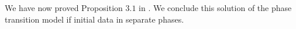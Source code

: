 \documentclass[10pt]{article}
\numberwithin{equation}{section}
\begin{document}
We have now proved Proposition $3.1$ in \cite{Colombo2003}. We conclude this solution of the phase transition model if initial data in separate phases. 

\end{document}
